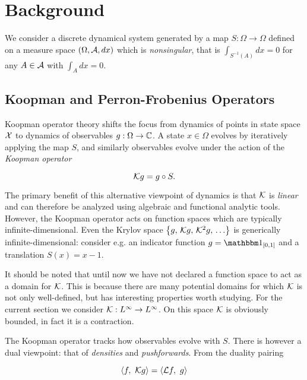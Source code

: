 
\section{Background}

We consider a discrete dynamical system generated by a map $S : \Omega \to \Omega$ defined 
on a measure space $( \Omega, \mathcal{A}, dx )$ which is \emph{nonsingular}, that is 
$\int_{S^{-1} (A)} dx = 0$ for any $A \in \mathcal{A}$ with $\int_A dx = 0$. 


\subsection{Koopman and Perron-Frobenius Operators}

Koopman operator theory shifts the focus from dynamics of points in state space $\mathcal{X}$ to 
dynamics of observables $g : \Omega \to \mathbb{C}$. A state $x \in \Omega$ evolves by iteratively 
applying the map $S$, and similarly observables evolve under the action of the 
\emph{Koopman operator}

\begin{equation}
    \mathcal{K} g = g \circ S . 
\end{equation}

The primary benefit of this alternative viewpoint of dynamics is that $\mathcal{K}$ is 
\emph{linear} and can therefore be analyzed using algebraic and functional analytic tools. 
However, the Koopman operator acts on function spaces which are typically 
infinite-dimensional. Even the Krylov space 
$\left\{ g,\, \mathcal{K} g,\, \mathcal{K}^2 g,\, \ldots \right\}$ is generically infinite-dimensional: 
consider e.g. an indicator function $g = \bbone_{\left[ 0, 1 \right]}$ and a translation 
$S (x) = x - 1$. 

It should be noted that until now we have not declared a function space to act as a domain 
for $\mathcal{K}$. This is because there are many potential domains for which $\mathcal{K}$ is not 
only well-defined, but has interesting properties worth studying. For the current section 
we consider $\mathcal{K} : L^\infty \to L^\infty$. On this space $\mathcal{K}$ is obviously bounded, 
in fact it is a contraction. 

The Koopman operator tracks how observables evolve with $S$. There is however a dual 
viewpoint: that of \emph{densities} and \emph{pushforwards}. From the duality pairing

\begin{equation}
    \label{eq:duality}
    \left\langle f,\ \mathcal{K} g \right\rangle = \left\langle \mathcal{L} f,\ g \right\rangle
\end{equation}

